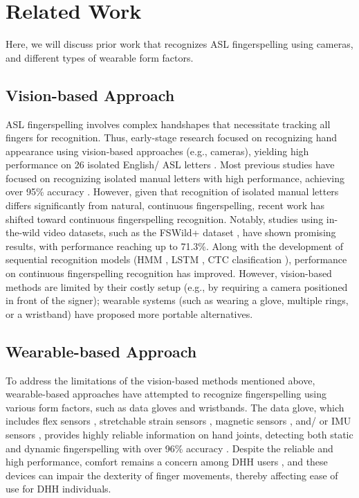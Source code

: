 \section{Related Work}
Here, we will discuss prior work that recognizes ASL fingerspelling using cameras, and different types of wearable form factors. 


\subsection{Vision-based Approach}
ASL fingerspelling involves complex handshapes that necessitate tracking all fingers for recognition. Thus, early-stage research focused on recognizing hand appearance using vision-based approaches (e.g., cameras), yielding high performance on 26 isolated English/ ASL letters \cite{feris2005recognition, kim2017lexicon,fowley2021sign, goh2006dynamic}. Most previous studies have focused on recognizing isolated manual letters with high performance, achieving over 95\% accuracy \cite{bohavcek2022sign, du2022full, hosain2021hand}. However, given that recognition of isolated manual letters differs significantly from natural, continuous fingerspelling, recent work has shifted toward continuous fingerspelling recognition. Notably, studies using in-the-wild video datasets, such as the FSWild+ dataset \cite{shi2019fingerspelling}, have shown promising results, with performance reaching up to 71.3\%. 
Along with the development of sequential recognition models (HMM \cite{martin2023fingerspeller,goh2006dynamic}, LSTM \cite{shi2019fingerspelling,pannattee2021novel}, CTC clasification \cite{fayyazsanavi2024fingerspelling, gu2022american, graves2006connectionist}), performance on continuous fingerspelling recognition has improved. However, vision-based methods are limited by their costly setup (e.g., by requiring a camera positioned in front of the signer); wearable systems (such as wearing a glove, multiple rings, or a wristband) have proposed more portable alternatives.

\subsection{Wearable-based Approach}
To address the limitations of the vision-based methods mentioned above, wearable-based approaches have attempted to recognize fingerspelling using various form factors, such as data gloves and wristbands.
The data glove, which includes flex sensors \cite{rizwan2019american, saggio2020sign}, stretchable strain sensors \cite{li2018skingest}, magnetic sensors \cite{rinalduzzi2021gesture}, and/ or IMU sensors \cite{lee2020sensor, martin2023fingerspeller, saggio2020sign}, provides highly reliable information on hand joints, detecting both static and dynamic fingerspelling with over 96\% accuracy \cite{lee2020sensor, saggio2020sign, rizwan2019american}. Despite the reliable and high performance, comfort remains a concern among DHH users \cite{kudrinko2022assessing}, and these devices can impair the dexterity of finger movements, thereby affecting ease of use for DHH individuals. 

